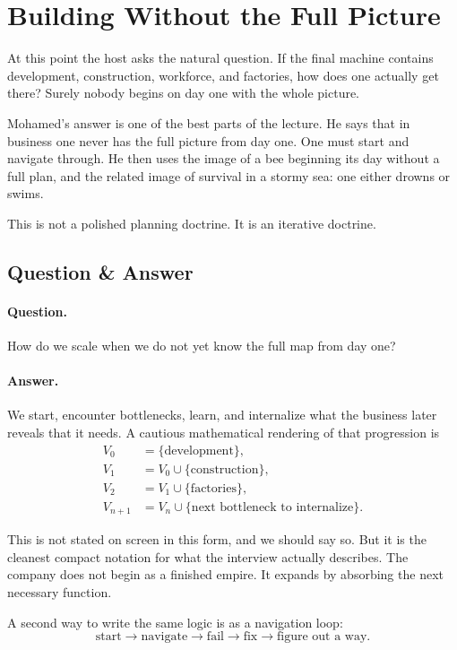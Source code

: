 \section{Building Without the Full Picture}

At this point the host asks the natural question. If the final machine contains development, construction, workforce, and factories, how does one actually get there? Surely nobody begins on day one with the whole picture.

Mohamed's answer is one of the best parts of the lecture. He says that in business one never has the full picture from day one. One must start and navigate through. He then uses the image of a bee beginning its day without a full plan, and the related image of survival in a stormy sea: one either drowns or swims.

This is not a polished planning doctrine. It is an iterative doctrine.

\subsection{Question \& Answer}

\paragraph{Question.} How do we scale when we do not yet know the full map from day one?

\paragraph{Answer.} We start, encounter bottlenecks, learn, and internalize what the business later reveals that it needs. A cautious mathematical rendering of that progression is
\begin{align}
V_0 &= \{\text{development}\},\\
V_1 &= V_0 \cup \{\text{construction}\},\\
V_2 &= V_1 \cup \{\text{factories}\},\\
V_{n+1} &= V_n \cup \{\text{next bottleneck to internalize}\}.
\end{align}

This is not stated on screen in this form, and we should say so. But it is the cleanest compact notation for what the interview actually describes. The company does not begin as a finished empire. It expands by absorbing the next necessary function.

A second way to write the same logic is as a navigation loop:
\begin{equation}
\text{start} \to \text{navigate} \to \text{fail} \to \text{fix} \to \text{figure out a way}.
\end{equation}

